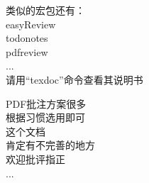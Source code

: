 \documentclass[fontset = none, t, aspectratio=169]{ctexbeamer}
\begin{document}
\begin{frame}
  类似的宏包还有：\\
  easyReview\\
  todonotes\\
  pdfreview\\...\\
  请用\enquote{\alert{texdoc}}命令查看其说明书
\end{frame}

\begin{frame}
  PDF批注方案很多\\
  根据习惯选用即可\\
  这个文档\\
  肯定有不完善的地方\\
  欢迎批评指正\\...
\end{frame}
\end{document}

